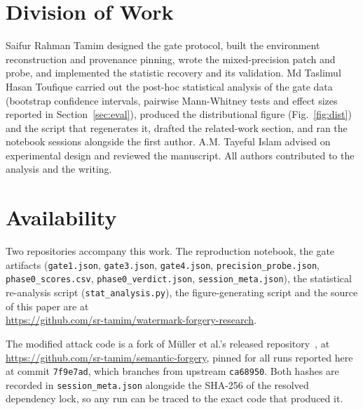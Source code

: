 \documentclass[10pt,twocolumn]{article}
\newcommand{\code}[1]{\texttt{\small #1}}
\begin{document}
\section*{Division of Work}

Saifur Rahman Tamim designed the gate protocol, built the environment reconstruction
and provenance pinning, wrote the mixed-precision patch and probe, and implemented the
statistic recovery and its validation. Md Taslimul Hasan Toufique carried out the
post-hoc statistical analysis of the gate data (bootstrap confidence intervals,
pairwise Mann-Whitney tests and effect sizes reported in Section~\ref{sec:eval}),
produced the distributional figure (Fig.~\ref{fig:dist}) and the script that
regenerates it, drafted the related-work section, and ran the notebook sessions
alongside the first author. A.M. Tayeful Islam
advised on experimental design and reviewed the manuscript. All authors contributed
to the analysis and the writing.

\section*{Availability}

Two repositories accompany this work. The reproduction notebook, the gate artifacts
(\code{gate1.json}, \code{gate3.json}, \code{gate4.json},
\code{precision\_probe.json}, \code{phase0\_scores.csv},
\code{phase0\_verdict.json}, \code{session\_meta.json}), the statistical re-analysis
script (\code{stat\_analysis.py}), the figure-generating script and the source of
this paper are at\\
\url{https://github.com/sr-tamim/watermark-forgery-research}.

The modified attack code is a fork of M\"uller et al.'s released
repository~\cite{semanticforgery-repo}, at\\
\url{https://github.com/sr-tamim/semantic-forgery}, pinned for all runs reported here
at commit \code{7f9e7ad}, which branches from upstream \code{ca68950}. Both hashes
are recorded in \code{session\_meta.json} alongside the SHA-256 of the resolved
dependency lock, so any run can be traced to the exact code that produced it.

\balance


\end{document}
